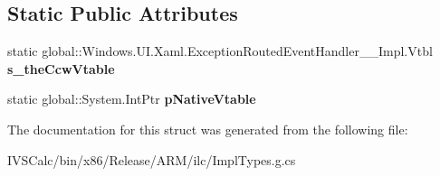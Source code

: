 \subsection*{Static Public Attributes}
\begin{DoxyCompactItemize}
\item 
\mbox{\label{struct_windows_1_1_u_i_1_1_xaml_1_1_exception_routed_event_handler_____impl_1_1_vtbl_acae5185c783ec675495deb505c253b87}} 
static global\+::\+Windows.\+U\+I.\+Xaml.\+Exception\+Routed\+Event\+Handler\+\_\+\+\_\+\+Impl.\+Vtbl {\bfseries s\+\_\+the\+Ccw\+Vtable}
\item 
\mbox{\label{struct_windows_1_1_u_i_1_1_xaml_1_1_exception_routed_event_handler_____impl_1_1_vtbl_affdadf7ebd7f76fc63e1e73829afe1ac}} 
static global\+::\+System.\+Int\+Ptr {\bfseries p\+Native\+Vtable}
\end{DoxyCompactItemize}


The documentation for this struct was generated from the following file\+:\begin{DoxyCompactItemize}
\item 
I\+V\+S\+Calc/bin/x86/\+Release/\+A\+R\+M/ilc/Impl\+Types.\+g.\+cs\end{DoxyCompactItemize}
